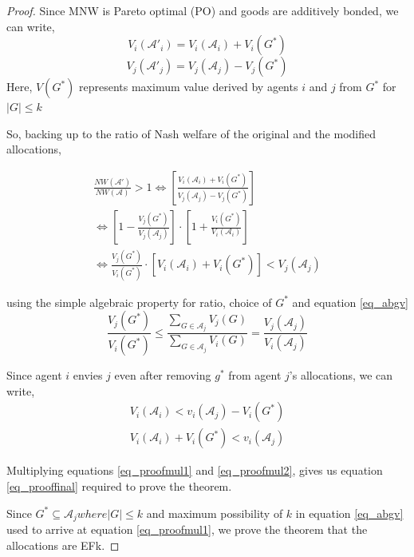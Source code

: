 \begin{proof}
Since MNW is Pareto optimal (PO) and goods are additively bonded, we can write,
$$
    V_i(\mathcal{A}'_i) = V_i(\mathcal{A}_i) + V_i(G^*)
$$
$$
    V_j(\mathcal{A}'_j) = V_j(\mathcal{A}_j) - V_j(G^*)
$$
Here, $V(G^*)$ represents maximum value derived by agents $i$ and $j$ from $G^*$ for $|G| \leq k$

So, backing up to the ratio of Nash welfare of the original and the modified allocations,

\begin{equation}
\label{eq_prooffinal}
\begin{gathered}
    \frac{NW(\mathcal{A}')}{NW(\mathcal{A})} > 1 \Leftrightarrow \left[\frac{V_i(\mathcal{A}_i) + V_i(G^*)}{V_j(\mathcal{A}_j) - V_j(G^*)}\right] \\
    \Leftrightarrow \left[1 - \frac{V_j(G^*)}{V_j(\mathcal{A}_j)}\right] \cdot \left[1 + \frac{V_i(G^*)}{V_i(\mathcal{A}_i)}\right] \\
    \Leftrightarrow \frac{V_j(G^*)}{V_i(G^*)} \cdot \left[V_i(\mathcal{A}_i) + V_i(G^*) \right] < V_j(\mathcal{A}_j)
\end{gathered}
\end{equation}

using the simple algebraic property for ratio, choice of $G^*$ and equation \ref{eq_abgv}
\begin{equation}
\label{eq_proofmul1}
    \frac{V_j(G^*)}{V_i(G^*)} \leq \frac{\sum_{G \in \mathcal{A}_j}V_j(G)}{\sum_{G \in \mathcal{A}_j}V_i(G)} = \frac{V_j(\mathcal{A}_j)}{V_i(\mathcal{A}_j)}
\end{equation}

Since agent $i$ envies $j$ even after removing $g^*$ from agent $j$'s allocations, we can write,
\begin{equation}
\label{eq_proofmul2}
\begin{gathered}
    V_i(\mathcal{A}_i) < v_i(\mathcal{A}_j) - V_i(G^*) \\
    V_i(\mathcal{A}_i) + V_i(G^*) < v_i(\mathcal{A}_j)
\end{gathered}
\end{equation}

Multiplying equations \ref{eq_proofmul1} and \ref{eq_proofmul2}, gives us equation \ref{eq_prooffinal} required to prove the theorem.

Since $G^* \subseteq \mathcal{A}_j where |G| \leq k$ and maximum possibility of $k$ in equation \ref{eq_abgv} used to arrive at equation \ref{eq_proofmul1}, we prove the theorem that the allocations are EFk.

\end{proof}

